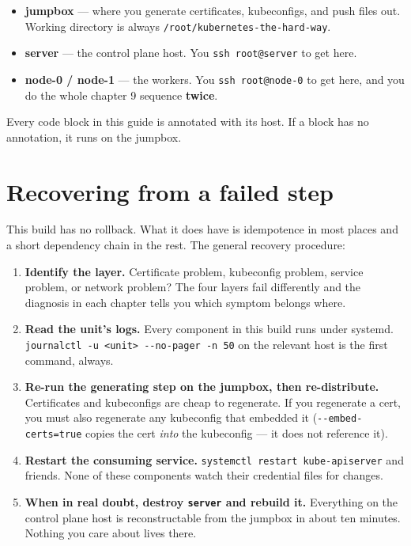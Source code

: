 \documentclass[11pt,oneside]{report}
\providecommand{\tightlist}{%
  \setlength{\itemsep}{0pt}\setlength{\parskip}{0pt}}
\begin{document}
\begin{itemize}
\tightlist
\item
  \textbf{jumpbox}
  --- where you
  generate
  certificates,
  kubeconfigs, and
  push files out.
  Working directory
  is always
  \texttt{/}\allowbreak{}\texttt{root/}\allowbreak{}\texttt{kubernetes-}\allowbreak{}\texttt{the-}\allowbreak{}\texttt{hard-}\allowbreak{}\texttt{way}.
\item
  \textbf{server}
  --- the control
  plane host. You
  \texttt{ssh\ root@server}
  to get here.
\item
  \textbf{node-0 /
  node-1} --- the
  workers. You
  \texttt{ssh\ root@node-0}
  to get here, and
  you do the whole
  chapter 9 sequence
  \textbf{twice}.
\end{itemize}

Every code block in
this guide is
annotated with its
host. If a block has
no annotation, it
runs on the jumpbox.

\hypertarget{recovering-from-a-failed-step}{%
\section*{Recovering
from a failed
step}\label{recovering-from-a-failed-step}}

This build has no
rollback. What it
does have is
idempotence in most
places and a short
dependency chain in
the rest. The
general recovery
procedure:

\begin{enumerate}
\def\labelenumi{\arabic{enumi}.}
\tightlist
\item
  \textbf{Identify
  the layer.}
  Certificate
  problem,
  kubeconfig
  problem, service
  problem, or
  network problem?
  The four layers
  fail differently
  and the diagnosis
  in each chapter
  tells you which
  symptom belongs
  where.
\item
  \textbf{Read the
  unit's logs.}
  Every component in
  this build runs
  under systemd.
  \texttt{journalctl\ -}\allowbreak{}\texttt{u\ \textless{}unit\textgreater{}\ -\/-no-}\allowbreak{}\texttt{pager\ -}\allowbreak{}\texttt{n\ 50}
  on the relevant
  host is the first
  command, always.
\item
  \textbf{Re-run the
  generating step on
  the jumpbox, then
  re-distribute.}
  Certificates and
  kubeconfigs are
  cheap to
  regenerate. If you
  regenerate a cert,
  you must also
  regenerate any
  kubeconfig that
  embedded it
  (\texttt{-\/-embed-}\allowbreak{}\texttt{certs=true}
  copies the cert
  \emph{into} the
  kubeconfig --- it
  does not reference
  it).
\item
  \textbf{Restart
  the consuming
  service.}
  \texttt{systemctl\ restart\ kube-}\allowbreak{}\texttt{apiserver}
  and friends. None
  of these
  components watch
  their credential
  files for changes.
\item
  \textbf{When in
  real doubt,
  destroy
  \texttt{server}
  and rebuild it.}
  Everything on the
  control plane host
  is reconstructable
  from the jumpbox
  in about ten
  minutes. Nothing
  you care about
  lives there.
\end{enumerate}
\end{document}
